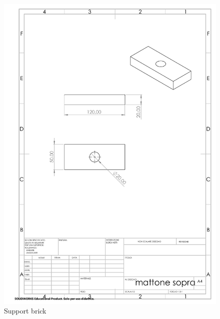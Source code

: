 \documentclass{article}
\begin{document}
\newpage
\begin{figure}[H]
    \centering
    \includegraphics[width=.9\linewidth]{technical_drawings/mattone_sopra.pdf}
    \caption{Support brick}
    \label{fig:mattone_sopra}
\end{figure}
\end{document}
